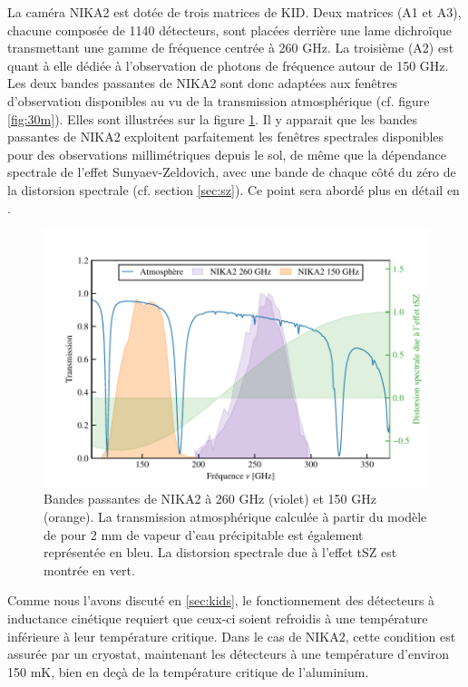 La caméra NIKA2 est dotée de trois matrices de KID.
Deux matrices (A1 et A3), chacune composée de 1140 détecteurs, sont placées derrière une lame dichroïque transmettant une gamme de fréquence centrée à 260 GHz.
La troisième (A2) est quant à elle dédiée à l'observation de photons de fréquence autour de 150 GHz.
Les deux bandes passantes de NIKA2 sont donc adaptées aux fenêtres d'observation disponibles au vu de la transmission atmosphérique (cf. figure \ref{fig:30m}).
Elles sont illustrées sur la figure \ref{fig:nk_bp}.
Il y apparait que les bandes passantes de NIKA2 exploitent parfaitement les fenêtres spectrales disponibles pour des observations millimétriques depuis le sol, de même que la dépendance spectrale de l'effet Sunyaev-Zeldovich, avec une bande de chaque côté du zéro de la distorsion spectrale (cf. section \ref{sec:sz}).
Ce point sera abordé plus en détail en .

\begin{figure}[t]
    \centering
    \includegraphics[width=.8\linewidth]{Figures/Chap_nk/bandpasses.pdf}
    \caption{
        Bandes passantes de NIKA2 à 260 GHz (violet) et 150 GHz (orange).
        La transmission atmosphérique calculée à partir du modèle de  pour 2 mm de vapeur d'eau précipitable est également représentée en bleu.
        La distorsion spectrale due à l'effet tSZ est montrée en vert.
    }
    \label{fig:nk_bp}
\end{figure}

Comme nous l'avons discuté en \ref{sec:kids}, le fonctionnement des détecteurs à inductance cinétique requiert que ceux-ci soient refroidis à une température inférieure à leur température critique.
Dans le cas de NIKA2, cette condition est assurée par un cryostat, maintenant les détecteurs à une température d'environ 150 mK, bien en deçà de la température critique de l'aluminium.

